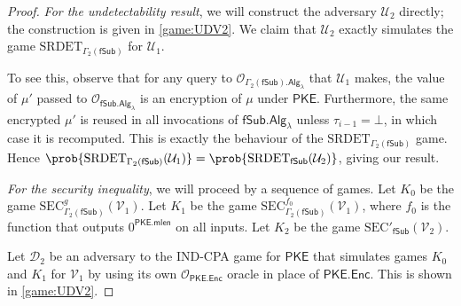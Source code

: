 \begin{proof}
\textit{For the undetectability result}, we will construct the adversary $\mathcal{U}_2$ directly; the construction is given in \autoref{game:UDV2}. We claim that $\mathcal{U}_2$ exactly simulates the game $\mathrm{SRDET}_{\Gamma_2(\mathsf{fSub})}$ for $\mathcal{U}_1$.

To see this, observe that for any query to $\mathcal{O}_{\Gamma_2(\mathsf{fSub}).\mathsf{Alg}_\lambda}$ that $\mathcal{U}_1$ makes, the value of $\mu'$ passed to $\mathcal{O}_{\mathsf{fSub.Alg}_\lambda}$ is an encryption of $\mu$ under $\mathsf{PKE}$. Furthermore, the same encrypted $\mu'$ is reused in all invocations of $\mathsf{fSub.Alg}_\lambda$ unless $\tau_{i-1}=\bot$, in which case it is recomputed. This is exactly the behaviour of the $\mathrm{SRDET}_{\Gamma_2(\mathsf{fSub})}$ game. Hence $\prob{\mathrm{SRDET}_{\Gamma_2(\mathsf{fSub})}(\mathcal{U}_1)}=\prob{\mathrm{SRDET}_{\mathsf{fSub}}(\mathcal{U}_2)}$, giving our result.

\textit{For the security inequality}, we will proceed by a sequence of games. Let $K_0$ be the game $\mathrm{SEC}^g_{\Gamma_2(\mathsf{fSub})}(\mathcal{V}_1)$. Let $K_1$ be the game $\mathrm{SEC}^{f_0}_{\Gamma_2(\mathsf{fSub})}(\mathcal{V}_1)$, where $f_0$ is the function that outputs $0^\mathsf{PKE.mlen}$ on all inputs. Let $K_2$ be the game $\mathrm{SEC'}_{\mathsf{fSub}}(\mathcal{V}_2)$.

Let $\mathcal{D}_2$ be an adversary to the IND-CPA game for $\mathsf{PKE}$ that simulates games $K_0$ and $K_1$ for $\mathcal{V}_1$ by using its own $\mathcal{O}_\mathsf{PKE.Enc}$ oracle in place of $\mathsf{PKE.Enc}$. This is shown in \autoref{game:UDV2}.


\end{proof}
